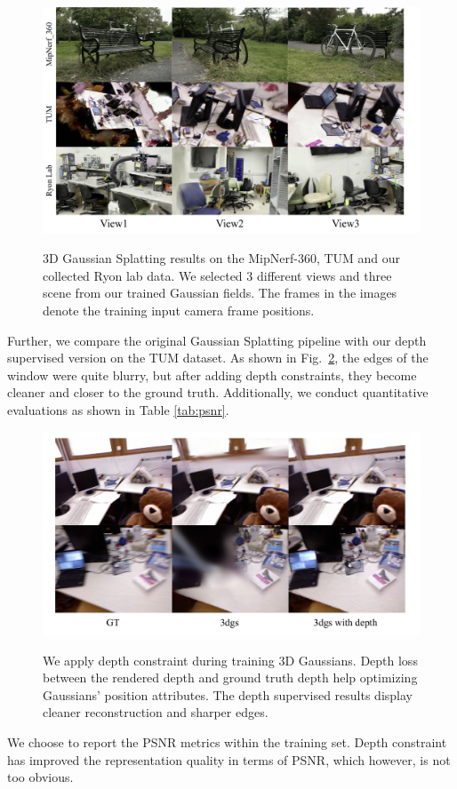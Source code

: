 \documentclass[conference]{IEEEtran}
\begin{document}
\begin{figure}[htbp]
    \centering
    \resizebox{9cm}{5cm}
    {\includegraphics{figures/3dgs_recon.pdf}}
    \caption{3D Gaussian Splatting results on the MipNerf-360, TUM and our collected Ryon lab data. We selected 3 different views and three scene from our trained Gaussian fields. The frames in the images denote the training input camera frame positions.}
    \label{gaussian_result}
\end{figure}

Further, we compare the original Gaussian Splatting pipeline with our depth supervised version on the TUM dataset. As shown in Fig.~\ref{gaussian_depth}, the edges of the window were quite blurry, but after adding depth constraints, they become cleaner and closer to the ground truth. Additionally, we conduct quantitative evaluations as shown in Table \ref{tab:psnr}. 
\begin{figure}[htbp]
    \centering
    \resizebox{9cm}{5cm}
    {\includegraphics{figures/gaussian_depth.pdf}}
    \caption{We apply depth constraint during training 3D Gaussians. Depth loss between the rendered depth and ground truth depth help optimizing Gaussians' position attributes. The depth supervised results display cleaner reconstruction and sharper edges.}
    \label{gaussian_depth}
\end{figure}
We choose to report the PSNR metrics within the training set. Depth constraint has improved the representation quality in terms of PSNR, which however, is not too obvious.
\end{document}
